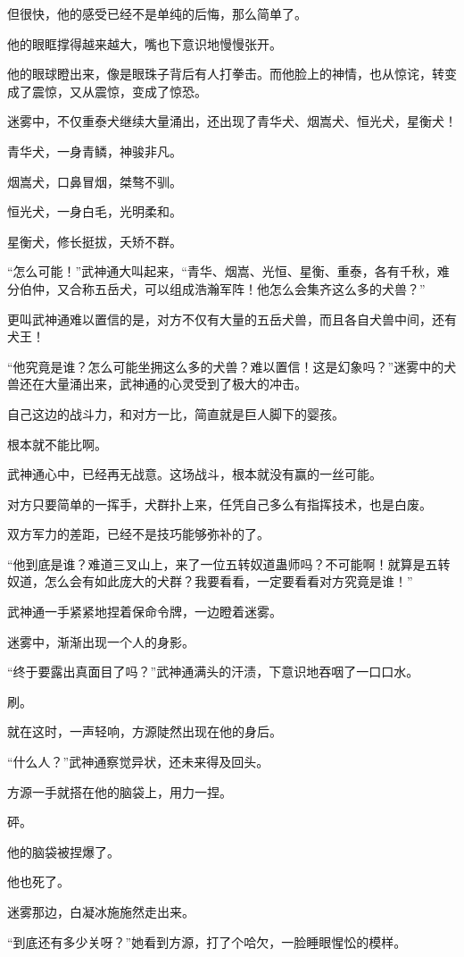 \begin{this_body}
但很快，他的感受已经不是单纯的后悔，那么简单了。

他的眼眶撑得越来越大，嘴也下意识地慢慢张开。

他的眼球瞪出来，像是眼珠子背后有人打拳击。而他脸上的神情，也从惊诧，转变成了震惊，又从震惊，变成了惊恐。

迷雾中，不仅重泰犬继续大量涌出，还出现了青华犬、烟嵩犬、恒光犬，星衡犬！

青华犬，一身青鳞，神骏非凡。

烟嵩犬，口鼻冒烟，桀骜不驯。

恒光犬，一身白毛，光明柔和。

星衡犬，修长挺拔，夭矫不群。

“怎么可能！”武神通大叫起来，“青华、烟嵩、光恒、星衡、重泰，各有千秋，难分伯仲，又合称五岳犬，可以组成浩瀚军阵！他怎么会集齐这么多的犬兽？”

更叫武神通难以置信的是，对方不仅有大量的五岳犬兽，而且各自犬兽中间，还有犬王！

“他究竟是谁？怎么可能坐拥这么多的犬兽？难以置信！这是幻象吗？”迷雾中的犬兽还在大量涌出来，武神通的心灵受到了极大的冲击。

自己这边的战斗力，和对方一比，简直就是巨人脚下的婴孩。

根本就不能比啊。

武神通心中，已经再无战意。这场战斗，根本就没有赢的一丝可能。

对方只要简单的一挥手，犬群扑上来，任凭自己多么有指挥技术，也是白废。

双方军力的差距，已经不是技巧能够弥补的了。

“他到底是谁？难道三叉山上，来了一位五转奴道蛊师吗？不可能啊！就算是五转奴道，怎么会有如此庞大的犬群？我要看看，一定要看看对方究竟是谁！”

武神通一手紧紧地捏着保命令牌，一边瞪着迷雾。

迷雾中，渐渐出现一个人的身影。

“终于要露出真面目了吗？”武神通满头的汗渍，下意识地吞咽了一口口水。

刷。

就在这时，一声轻响，方源陡然出现在他的身后。

“什么人？”武神通察觉异状，还未来得及回头。

方源一手就搭在他的脑袋上，用力一捏。

砰。

他的脑袋被捏爆了。

他也死了。

迷雾那边，白凝冰施施然走出来。

“到底还有多少关呀？”她看到方源，打了个哈欠，一脸睡眼惺忪的模样。

\end{this_body}

